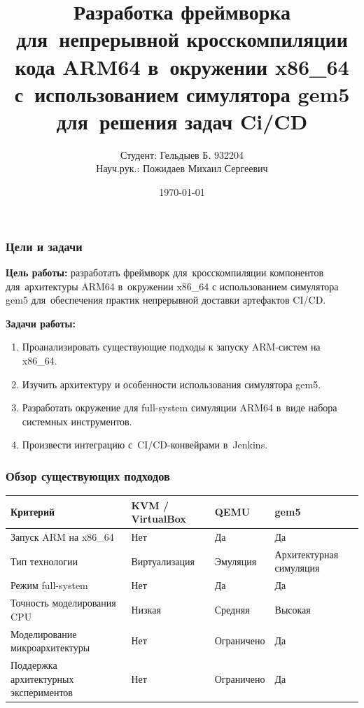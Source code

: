 \documentclass{beamer}
\title{Разработка фреймворка для~непрерывной кросскомпиляции кода ARM64 в~окружении x86\_64 с~использованием симулятора gem5 для~решения задач Ci/CD}
\author{Студент: Гельдыев Б. 932204 \\ Науч.рук.: Пожидаев Михаил Сергеевич}
\date{\today}
\begin{document}
\maketitle

\begin{frame}[shrink=10]
\frametitle{Цели и задачи}
\textbf{Цель работы:} разработать фреймворк для~кросскомпиляции компонентов для~архитектуры ARM64 в~окружении x86\_64 с использованием симулятора gem5 для~обеспечения практик  непрерывной доставки артефактов CI/CD.

\medskip
\textbf{Задачи работы:}
\begin{enumerate}
    \item Проанализировать существующие подходы к запуску ARM-систем на x86\_64.
    \item Изучить архитектуру и особенности использования симулятора gem5.
    \item Разработать окружение для full-system симуляции ARM64 в~виде набора системных инструментов.

         \item Произвести интеграцию с~CI/CD-конвейрами в~Jenkins.
      
\end{enumerate}
\end{frame}

\begin{frame}
\frametitle{Обзор существующих подходов}
\footnotesize
\setlength{\tabcolsep}{4pt}
\begin{tabularx}{\textwidth}{|X|X|p{1.4cm}|X|}
\hline
\rowcolor{blue!15} \centering Критерий & \centering KVM / VirtualBox & \centering QEMU & \centering\arraybackslash gem5 \\
\hline
Запуск ARM на x86\_64 & Нет & Да & Да \\
\hline
Тип технологии & Виртуализация & Эмуляция & Архитектурная симуляция \\
\hline
Режим full-system & Нет & Да & Да \\
\hline
Точность моделирования CPU & Низкая & Средняя & Высокая \\
\hline
Моделирование микроархитектуры & Нет & Ограничено & Да \\
\hline
Поддержка архитектурных экспериментов & Нет & Ограничено & Да \\
\hline
\end{tabularx}
\end{frame}
\end{document}
